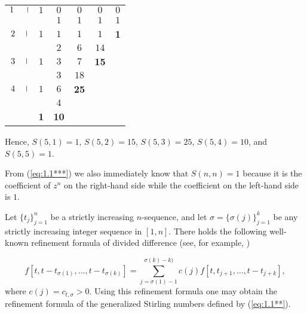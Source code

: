  \begin{center}
\begin{tabular}{cccccc}
$1 \hspace{.23in}\vline$ & $1$ & $0$& $0$ & $0$ & $0$\\
 \rule[-3mm]{0mm}{8mm}
\hspace{.21 in} \vline&  & $1$& $1$& $1$ & $ 1$\\
 \hline \rule[-3mm]{0mm}{8mm}
$2\hspace{.19 in} \vline$ & $1$ & $1$ &$1$ & $1$ & {\bf 1}\\
  \rule[-3mm]{0mm}{8mm}
\hspace{.21 in} \vline&  & $2$& $6$& $14$ &\\
 \hline \rule[-3mm]{0mm}{8mm}
 $3 \hspace{.19in}\vline$& $1$ & $3$ &$7$ & {\bf 15} &\\
 \rule[-3mm]{0mm}{8mm}
\hspace{.21 in} \vline&  & $3$& $18$& & \\
 \hline \rule[-3mm]{0mm}{8mm}
 $4 \hspace{.19in}\vline$ & $1$ &$6$ & {\bf 25}& & \\
 \rule[-3mm]{0mm}{8mm}
 \hspace{.25in}\vline & & $4$ & & &\\
 \hline\rule[-3mm]{0mm}{8mm}
 &{\bf 1} &{\bf 10} &  & &\\
 \end{tabular}
 \end{center}
 \vspace{.15 in}
Hence, $S(5,1)=1$, $S(5,2)=15$, $S(5,3)=25$, $S(5,4)=10$, and $S(5,5)=1$.

From (\ref{eq:1.1***}) we also immediately know that $S(n,n)=1$ because it is the coefficient of $z^n$ on the right-hand side while the coefficient
on the left-hand side is $1$.

\medbreak



Let $\{ t_j\}^n_{j=1}$ be a strictly increasing $n$-sequence, and let $\sigma=\{ \sigma(j)\}^k_{j=1}$ be any strictly increasing integer sequence in $[1,n]$. There holds the following well-known refinement formula of divided difference (see, for example, \cite{deB})

\[
f[t, t-t_{\sigma(1)}, \ldots, t-t_{\sigma(k)}]=\sum^{\sigma(k)-k)}_{j=\sigma(1)-1}c(j)f[t,t_{j+1},\ldots, t-t_{j+k}],
\]
where $c(j)=c_{t,\sigma}>0$. Using this refinement formula one may obtain the refinement formula of the generalized Stirling numbers defined by (\ref{eq:1.1**}).

